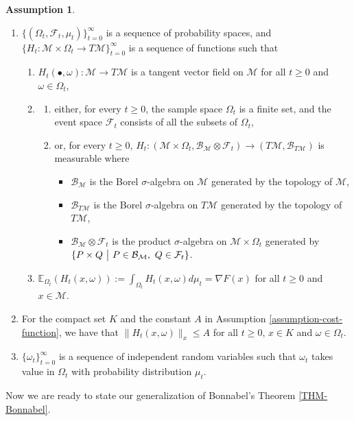 \documentclass{amsart}
\newcommand{\E}{\mathbb{E}}
\newcommand{\fil}{\mathcal{F}}
\newcommand{\M}{\mathcal{M}}
\newcommand{\B}{\mathcal{B}}
\theoremstyle{plain}
\theoremstyle{definition}
\newtheorem{assumption}[theorem]{Assumption}
\theoremstyle{remark}
\numberwithin{theorem}{section}
\numberwithin{equation}{section}
\begin{document}
\begin{assumption}\label{assumption-probability-space-varying}
\begin{enumerate}
	\item $\{(\Omega_t,\fil_t, \mu_t)\}_{t=0}^\infty$ is a sequence of probability spaces, and $\{H_t:\M \times \Omega_t \rightarrow T\M\}_{t=0}^\infty$ is a sequence of functions such that 
	\begin{enumerate}
		\item $H_t(\bullet, \omega): \M\rightarrow T\M$ is a tangent vector field on $\M$ for all $t\geq 0$ and $\omega \in \Omega_t$,
		\item 
		 \begin{enumerate}
		  \item either, for every $t\geq 0$, the sample space $\Omega_t$ is a finite set, and the event space $\fil_t$ consists of all the subsets of $\Omega_t$,
		  \item or, for every $t\geq 0$, $H_t:(\M \times \Omega_t, \B_{\M}\otimes \fil_t) \rightarrow (T\M, \B_{T\M})$ is measurable where
			 \begin{itemize}
				 \item $\B_{\M}$ is the Borel $\sigma$-algebra on $\M$ generated by the topology of $\M$,
				 \item $\B_{T\M}$ is the Borel $\sigma$-algebra on $T\M$ generated by the topology of $T\M$,
				 \item $\B_{\M}\otimes \fil_t$ is the product $\sigma$-algebra on $\M \times \Omega_t$ generated by $\{P\times Q~\big{|}~P\in \B_{\M}, ~Q \in \fil_t\}$.
			 \end{itemize}
	   \end{enumerate}
	  \item $\E_{\Omega_t}(H_t(x, \omega)) :=\int_{\Omega_t} H_t(x, \omega) d\mu_t = \nabla F(x)$ for all $t\geq 0$ and  $x \in \M$. 
	\end{enumerate}
	\item For the compact set $K$ and the constant $A$ in Assumption \ref{assumption-cost-function}, we have that $\| H_t(x,\omega)\|_x \leq A$ for all $t\geq 0$, $x \in K$ and $\omega \in \Omega_t$.
  \item $\{\omega_t\}_{t=0}^\infty$ is a sequence of independent random variables such that $\omega_t$ takes value in $\Omega_t$ with probability distribution $\mu_t$.
\end{enumerate}
\end{assumption}


Now we are ready to state our generalization of Bonnabel's Theorem \ref{THM-Bonnabel}.
\end{document}
